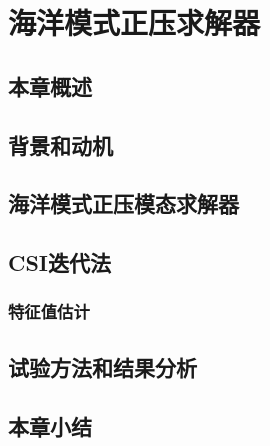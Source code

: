 \chapter{海洋模式正压求解器}
\label{cha:barosSolver}

\section{本章概述}

\section{背景和动机}
\label{sec:baroBackgroud}

\section{海洋模式正压模态求解器}
\label{sec:baro1}

\section{CSI迭代法}
\label{sec:barocsi}

\subsection{特征值估计}
\label{sec:barocsi}

\section{试验方法和结果分析}
\label{sec:verifyExp}

\section{本章小结}
\label{sec:verifyConclusion}





